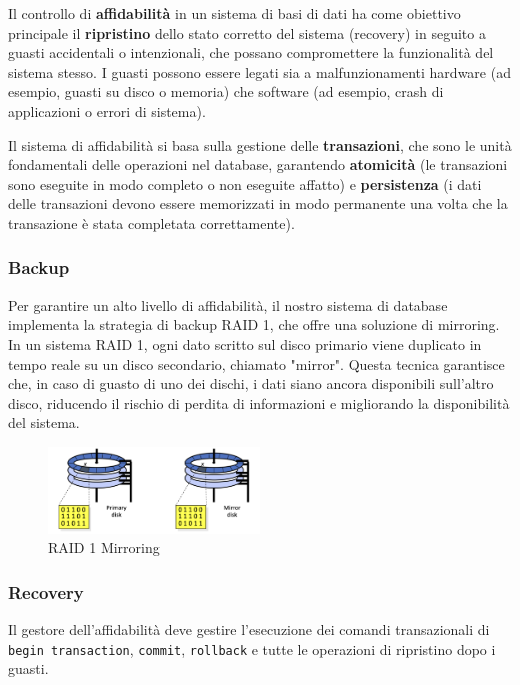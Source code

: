 Il controllo di \textbf{affidabilità} in un sistema di basi di dati ha come obiettivo principale il \textbf{ripristino} dello stato corretto del sistema (recovery) in seguito a guasti accidentali o intenzionali, che possano compromettere la funzionalità del sistema stesso. I guasti possono essere legati sia a malfunzionamenti hardware (ad esempio, guasti su disco o memoria) che software (ad esempio, crash di applicazioni o errori di sistema).

Il sistema di affidabilità si basa sulla gestione delle \textbf{transazioni}, che sono le unità fondamentali delle operazioni nel database, garantendo \textbf{atomicità} (le transazioni sono eseguite in modo completo o non eseguite affatto) e \textbf{persistenza} (i dati delle transazioni devono essere memorizzati in modo permanente una volta che la transazione è stata completata correttamente).

\subsubsection{Backup}

Per garantire un alto livello di affidabilità, il nostro sistema di database implementa la strategia di backup RAID 1, che offre una soluzione di mirroring. In un sistema RAID 1, ogni dato scritto sul disco primario viene duplicato in tempo reale su un disco secondario, chiamato "mirror". Questa tecnica garantisce che, in caso di guasto di uno dei dischi, i dati siano ancora disponibili sull'altro disco, riducendo il rischio di perdita di informazioni e migliorando la disponibilità del sistema.

\begin{figure}[h]
    \centering
    \includegraphics[width=0.5\textwidth]{Media/raid.png}
    \caption{RAID 1 Mirroring}
    \label{fig:raid}
\end{figure}

\subsubsection{Recovery}

Il gestore dell’affidabilità deve gestire l’esecuzione dei comandi transazionali di \texttt{begin transaction}, \texttt{commit}, \texttt{rollback} e tutte le operazioni di ripristino dopo i guasti.

